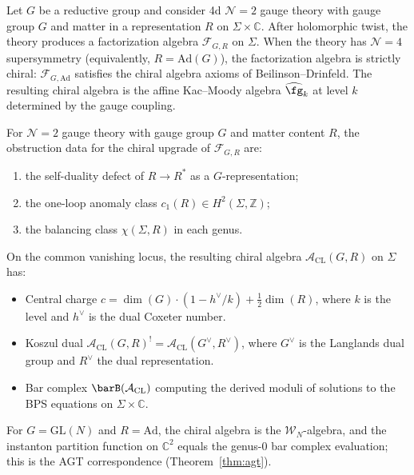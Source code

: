 \begin{theorem}[CL chirality for \texorpdfstring{$\mathcal{N}=4$}{N=4}]
\label{thm:cl-n4-chirality}
\cite{CL16}
Let $G$ be a reductive group and consider 4d $\mathcal{N}=2$ gauge theory
with gauge group $G$ and matter in a representation $R$ on $\Sigma \times \mathbb{C}$.
After holomorphic twist, the theory produces a factorization algebra
$\mathcal{F}_{G,R}$ on $\Sigma$. When the theory has $\mathcal{N}=4$
supersymmetry (equivalently, $R = \mathrm{Ad}(G)$), the factorization algebra
is strictly chiral: $\mathcal{F}_{G,\mathrm{Ad}}$ satisfies the chiral algebra
axioms of Beilinson--Drinfeld. The resulting chiral algebra is the affine
Kac--Moody algebra $\widehat{\fg}_k$ at level $k$ determined by the gauge coupling.
\end{theorem}

\begin{proposition}
\label{prop:cl-general-chirality-obstructions}
For $\mathcal{N}=2$ gauge theory with gauge group $G$ and matter content $R$,
the obstruction data for the chiral upgrade of
$\mathcal{F}_{G,R}$ are:
\begin{enumerate}[label=\textup{(\roman*)}]
\item the self-duality defect of $R \to R^*$ as a $G$-representation;
\item the one-loop anomaly class $c_1(R) \in H^2(\Sigma, \mathbb{Z})$;
\item the balancing class $\chi(\Sigma, R)$ in each genus.
\end{enumerate}
On the common vanishing locus, the resulting chiral algebra
$\mathcal{A}_{\mathrm{CL}}(G, R)$
on $\Sigma$ has:
\begin{itemize}
\item Central charge $c = \dim(G) \cdot (1 - h^\vee/k) + \tfrac{1}{2}\dim(R)$,
 where $k$ is the level and $h^\vee$ is the dual Coxeter number.
\item Koszul dual $\mathcal{A}_{\mathrm{CL}}(G, R)^! = \mathcal{A}_{\mathrm{CL}}(G^\vee, R^\vee)$,
 where $G^\vee$ is the Langlands dual group and $R^\vee$ the dual representation.
\item Bar complex $\barB(\mathcal{A}_{\mathrm{CL}})$ computing the derived moduli
 of solutions to the BPS equations on $\Sigma \times \mathbb{C}$.
\end{itemize}
For $G = \mathrm{GL}(N)$ and $R = \mathrm{Ad}$, the chiral algebra is the
$\mathcal{W}_N$-algebra, and the instanton partition function on $\mathbb{C}^2$
equals the genus-$0$ bar complex evaluation; this is the AGT correspondence
(Theorem~\ref{thm:agt}).
\end{proposition}

